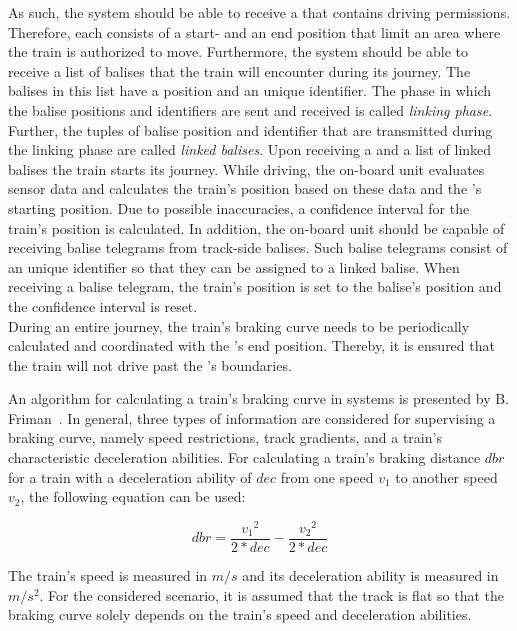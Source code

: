 \noindent
As such, the system should be able to receive a  that contains driving permissions.
Therefore, each  consists of a start- and an end position that limit an area where the train is authorized to move.
Furthermore, the system should be able to receive a list of balises that the train will encounter during its journey.
The balises in this list have a position and an unique identifier.
The phase in which the balise positions and identifiers are sent and received is called \textit{linking phase}.
Further, the tuples of balise position and identifier that are transmitted during the linking phase are called \textit{linked balises}.
Upon receiving a  and a list of linked balises the train starts its journey.
While driving, the on-board unit evaluates sensor data and calculates the train's position based on these data and the 's starting position.
Due to possible inaccuracies, a confidence interval for the train's position is calculated.
In addition, the on-board unit should be capable of receiving balise telegrams from track-side balises.
Such balise telegrams consist of an unique identifier so that they can be assigned to a linked balise.
When receiving a balise telegram, the train's position is set to the balise's position and the confidence interval is reset.
\\

\noindent
During an entire journey, the train's braking curve needs to be periodically calculated and coordinated with the 's end position.
Thereby, it is ensured that the train will not drive past the 's boundaries.

An algorithm for calculating a train's braking curve in  systems is presented by B. Friman~\cite{CalculateBrakeCurveFriman}.
In general, three types of information are considered for supervising a braking curve, namely speed restrictions, track gradients, and a train's characteristic deceleration abilities.
For calculating a train's braking distance $dbr$ for a train with a deceleration ability of $dec$ from one speed $v_1$ to another speed $v_2$, the following equation can be used:

\begin{equation}
dbr = \frac{{v_1}^2}{2*dec} - \frac{{v_2}^2}{2*dec}
\end{equation}

\noindent
The train's speed is measured in $m/s$ and its deceleration ability is measured in $m/s^2$.
For the considered scenario, it is assumed that the track is flat so that the braking curve solely depends on the train's speed and deceleration abilities.
\\

